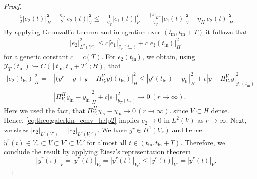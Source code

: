\documentclass[10pt,a4paper]{amsart}
\newcommand{\mY}{{\mathscr Y}}
\newcommand{\norm}[2]{\left|#1\right|_{#2}}
\newcommand{\tint}{t_{\mathrm{in}}}
\newcommand{\yint}{y_{\mathrm{in}}}
\begin{document}
\begin{proof}
\begin{align}
         \tfrac{1}{2}\norm{\dot e_2(t)}{H}^2+\tfrac{\eta_V}{2}\norm{e_2(t)}{V}^2
        \leq & \tfrac{1}{\eta_V}\norm{\dot e_1(t)}{V'}^2+\tfrac{\norm{A}{L^\infty}}{\eta_V} \norm{e_1(t)}{V}^2+\eta_H\norm{e_2(t)}{H}^2
    \end{align}
    By applying Gronwall's Lemma and integration over $(\tint,\tint+T)$ it follows that
    \begin{align}\label{eq:theo:galerkin_conv_help2}
        \norm{e_2}{L^2(V)}^2\leq c\norm{\dot e_1}{\mY_T(\tint)}^2+c\norm{e_2(\tint)}{H}^2.
    \end{align}
    for a generic constant $c=c(T)$.
    For $e_2(\tint)$, we obtain, using $\mY_T(\tint)\hookrightarrow C([\tint,\tint+T];H)$, that
    \begin{align*}
      \norm{e_2(\tint)}{H}^2=&\norm{\big(y^r-y+y-\Pi^V_{V_r} y\big)(\tint)}{H}^2\leq  \norm{y^r(\tint)-\yint}{H}^2+ c \norm{y-\Pi^V_{V_r} y}{\mY_T(\tint)}^2\\
      = & \norm{\Pi^H_{V_r} \yint-\yint}{H}^2+c \norm{e_1}{\mY_T(\tint)}^2 \to 0 \ (r\to \infty).
    \end{align*}
    Here we used the fact, that $\Pi^H_{V_r}\yint-\yint \to 0 \ (r\to\infty)$, since $V\subset H$ dense.
    Hence, \eqref{eq:theo:galerkin_conv_help2} implies $e_2\to 0$ in $L^2(V)$ as $r\to\infty$. Next, we show $\norm{\dot e_2}{L^2(V')}=\norm{\dot e_2}{L^2(V_r')}$. We have $y^r\in H^1(V_r)$ and hence $\dot y^r(t)\in V_r\subset V\subset V'\subset V_r'$ for almost all $t\in (\tint,\tint+T)$. Therefore, we conclude the result by applying Riesz's representation theorem
    \begin{equation}\label{eq:hh0}
        \norm{\dot y^r(t)}{V}= \norm{\dot y^r(t)}{V_r}=\norm{\dot y^r(t)}{V_r'}\leq \norm{\dot y^r(t)}{V'}=\norm{\dot y^r(t)}{V}.

\end{equation}
\end{proof}
\end{document}
